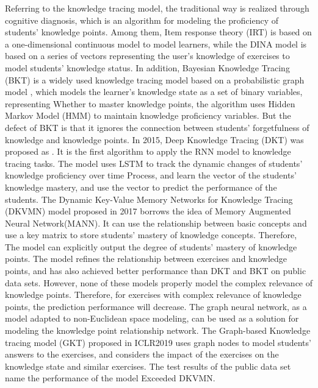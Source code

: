 Referring to the knowledge tracing model, the traditional way is realized through cognitive diagnosis, which is an algorithm for modeling the proficiency of students' knowledge points. Among them, Item response theory (IRT)\cite{embretson2013item} is based on a one-dimensional continuous model to model learners, while the DINA model is based on a series of vectors representing the user's knowledge of exercises to model students' knowledge status\cite{de2009dina}. In addition, Bayesian Knowledge Tracing (BKT) is a widely used knowledge tracing model based on a probabilistic graph model \cite{yudelson2013individualized}, which models the learner's knowledge state as a set of binary variables, representing Whether to master knowledge points, the algorithm uses Hidden Markov Model (HMM) to maintain knowledge proficiency variables. But the defect of BKT is that it ignores the connection between students' forgetfulness of knowledge and knowledge points. In 2015, Deep Knowledge Tracing (DKT) was proposed as \cite{piech2015deep}. It is the first algorithm to apply the RNN model to knowledge tracing tasks. The model uses LSTM to track the dynamic changes of students' knowledge proficiency over time Process, and learn the vector of the students' knowledge mastery, and use the vector to predict the performance of the students. The Dynamic Key-Value Memory Networks for Knowledge Tracing (DKVMN)\cite{zhang2017dynamic} model proposed in 2017 borrows the idea of Memory Augmented Neural Network(MANN)\cite{santoro2016meta}. It can use the relationship between basic concepts and use a key matrix to store students' mastery of knowledge concepts. Therefore, The model can explicitly output the degree of students' mastery of knowledge points. The model refines the relationship between exercises and knowledge points, and has also achieved better performance than DKT and BKT on public data sets. However, none of these models properly model the complex relevance of knowledge points. Therefore, for exercises with complex relevance of knowledge points, the prediction performance will decrease. The graph neural network, as a model adapted to non-Euclidean space modeling, can be used as a solution for modeling the knowledge point relationship network. The Graph-based Knowledge tracing model (GKT)\cite{nakagawa2019graphbased} proposed in ICLR2019 uses graph nodes to model students' answers to the exercises, and considers the impact of the exercises on the knowledge state and similar exercises. The test results of the public data set name the performance of the model Exceeded DKVMN.


